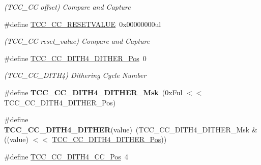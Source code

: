 \begin{DoxyCompactItemize}
\begin{DoxyCompactList}\small\item\em (T\+C\+C\+\_\+\+C\+C offset) Compare and Capture \end{DoxyCompactList}\item 
\hypertarget{group___s_a_m_l21___t_c_c_ga550d84fc679baba35dab3b2c4b6ef1ec}{}\#define \hyperlink{group___s_a_m_l21___t_c_c_ga550d84fc679baba35dab3b2c4b6ef1ec}{T\+C\+C\+\_\+\+C\+C\+\_\+\+R\+E\+S\+E\+T\+V\+A\+L\+U\+E}~0x00000000ul\label{group___s_a_m_l21___t_c_c_ga550d84fc679baba35dab3b2c4b6ef1ec}

\begin{DoxyCompactList}\small\item\em (T\+C\+C\+\_\+\+C\+C reset\+\_\+value) Compare and Capture \end{DoxyCompactList}\item 
\hypertarget{group___s_a_m_l21___t_c_c_gac0f98e5b9363a0f20b032832149aae30}{}\#define \hyperlink{group___s_a_m_l21___t_c_c_gac0f98e5b9363a0f20b032832149aae30}{T\+C\+C\+\_\+\+C\+C\+\_\+\+D\+I\+T\+H4\+\_\+\+D\+I\+T\+H\+E\+R\+\_\+\+Pos}~0\label{group___s_a_m_l21___t_c_c_gac0f98e5b9363a0f20b032832149aae30}

\begin{DoxyCompactList}\small\item\em (T\+C\+C\+\_\+\+C\+C\+\_\+\+D\+I\+T\+H4) Dithering Cycle Number \end{DoxyCompactList}\item 
\hypertarget{group___s_a_m_l21___t_c_c_ga0da9b78e66d3888688aa4d48590bc55b}{}\#define {\bfseries T\+C\+C\+\_\+\+C\+C\+\_\+\+D\+I\+T\+H4\+\_\+\+D\+I\+T\+H\+E\+R\+\_\+\+Msk}~(0x\+Ful $<$$<$ T\+C\+C\+\_\+\+C\+C\+\_\+\+D\+I\+T\+H4\+\_\+\+D\+I\+T\+H\+E\+R\+\_\+\+Pos)\label{group___s_a_m_l21___t_c_c_ga0da9b78e66d3888688aa4d48590bc55b}

\item 
\hypertarget{group___s_a_m_l21___t_c_c_ga06f3c287316a4dc5ecda22ef222838f6}{}\#define {\bfseries T\+C\+C\+\_\+\+C\+C\+\_\+\+D\+I\+T\+H4\+\_\+\+D\+I\+T\+H\+E\+R}(value)~(T\+C\+C\+\_\+\+C\+C\+\_\+\+D\+I\+T\+H4\+\_\+\+D\+I\+T\+H\+E\+R\+\_\+\+Msk \& ((value) $<$$<$ \hyperlink{group___s_a_m_l21___t_c_c_gac0f98e5b9363a0f20b032832149aae30}{T\+C\+C\+\_\+\+C\+C\+\_\+\+D\+I\+T\+H4\+\_\+\+D\+I\+T\+H\+E\+R\+\_\+\+Pos}))\label{group___s_a_m_l21___t_c_c_ga06f3c287316a4dc5ecda22ef222838f6}

\item 
\hypertarget{group___s_a_m_l21___t_c_c_ga92b4f7c07cbbac0d6154d1833d5b5b48}{}\#define \hyperlink{group___s_a_m_l21___t_c_c_ga92b4f7c07cbbac0d6154d1833d5b5b48}{T\+C\+C\+\_\+\+C\+C\+\_\+\+D\+I\+T\+H4\+\_\+\+C\+C\+\_\+\+Pos}~4\label{group___s_a_m_l21___t_c_c_ga92b4f7c07cbbac0d6154d1833d5b5b48}


\end{DoxyCompactItemize}
